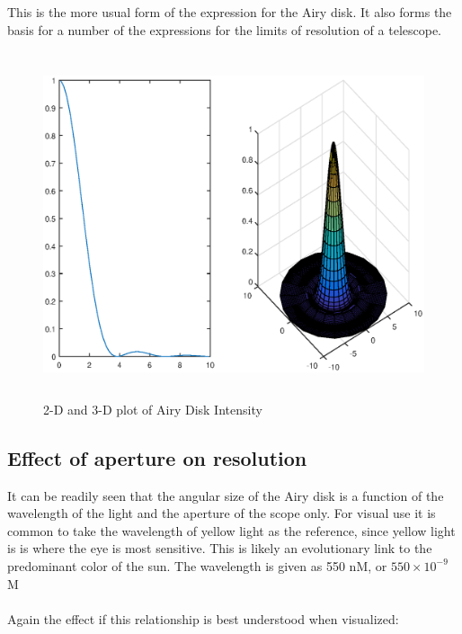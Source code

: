 \documentclass[11pt]{article}
\begin{document}
This is the more usual form of the expression for the Airy disk.  It also forms the basis for a number of the expressions for the limits of resolution of a telescope.

\begin{figure}[htb]
	\begin{center}
		\includegraphics[width=5.5in, height=4in ]{airy_bessel.eps}
		\caption{2-D and 3-D plot of Airy Disk Intensity}
		\label{fig:airyplots}
	\end{center}
\end{figure}

\subsection{Effect of aperture on resolution}

It can be readily seen that the angular size of the Airy disk is a function of the wavelength of the light and the aperture of the scope only.  For visual use it is common to take the wavelength of yellow light as the reference, since yellow light is is where the eye is most sensitive.  This is likely an evolutionary link to the predominant color of the sun.  The wavelength is given as 550 nM, or $550\times 10^{-9}$ M 

\paragraph{}
Again the effect if this relationship is best understood when visualized:
\end{document}

